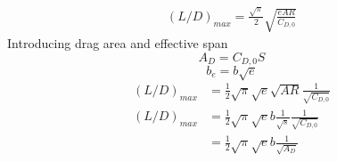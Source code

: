 \documentclass{article}
\begin{document}
\begin{align*}
(L/D)_{max} = \frac{\sqrt{\pi}}{2}\sqrt{\frac{eAR}{C_{D,0}}}
\end{align*}
Introducing drag area and effective span
\[
A_D=C_{D,0} S
\]
\[
b_e=b\sqrt{e}
\]
\begin{align*}
(L/D)_{max} & = \frac{1}{2} \sqrt{\pi} \sqrt{e} \sqrt{AR} \frac{1}{\sqrt{C_{D,0}}} \\
(L/D)_{max} & = \frac{1}{2} \sqrt{\pi} \sqrt{e} b \frac{1}{\sqrt{s}} \frac{1}{\sqrt{C_{D,0}}} \\
& = \frac{1}{2} \sqrt{\pi} \sqrt{e} b \frac{1}{\sqrt{A_D}}
\end{align*}
\end{document}
